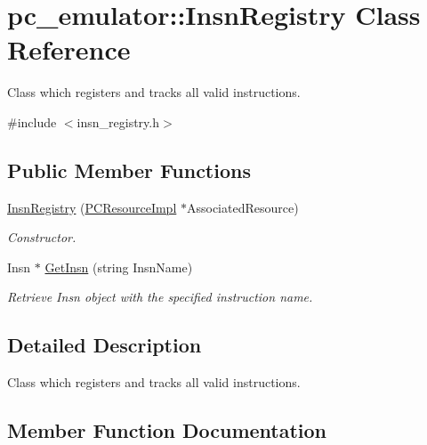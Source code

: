 \hypertarget{classpc__emulator_1_1InsnRegistry}{}\section{pc\+\_\+emulator\+:\+:Insn\+Registry Class Reference}
\label{classpc__emulator_1_1InsnRegistry}


Class which registers and tracks all valid instructions.  




{\ttfamily \#include $<$insn\+\_\+registry.\+h$>$}

\subsection*{Public Member Functions}
\begin{DoxyCompactItemize}
\item 
\hyperlink{classpc__emulator_1_1InsnRegistry_aaa8126e6e72a71a8a13147585ff8e110}{Insn\+Registry} (\hyperlink{classpc__emulator_1_1PCResourceImpl}{P\+C\+Resource\+Impl} $\ast$Associated\+Resource)\hypertarget{classpc__emulator_1_1InsnRegistry_aaa8126e6e72a71a8a13147585ff8e110}{}\label{classpc__emulator_1_1InsnRegistry_aaa8126e6e72a71a8a13147585ff8e110}

\begin{DoxyCompactList}\small\item\em Constructor. \end{DoxyCompactList}\item 
Insn $\ast$ \hyperlink{classpc__emulator_1_1InsnRegistry_ab07163f65b9c0d0a472392c365ffbc1b}{Get\+Insn} (string Insn\+Name)
\begin{DoxyCompactList}\small\item\em Retrieve Insn object with the specified instruction name. \end{DoxyCompactList}\end{DoxyCompactItemize}


\subsection{Detailed Description}
Class which registers and tracks all valid instructions. 

\subsection{Member Function Documentation}
